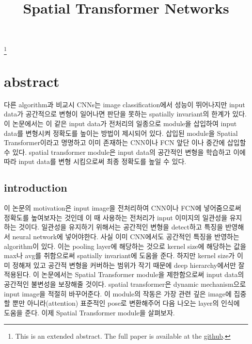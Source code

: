 \documentclass[extendedabs]{bmvc2k}
\begin{document}
\title{Spatial Transformer Networks}
\maketitle
\let\thefootnote\relax\footnote{This is an extended abstract. The full paper is available at the \href{https://github.com/LeeGwanHui/TIL/tree/main/deeplearning_ham}{github}. }
\vspace{-0.2in}

\section{abstract}

\quad 다른 algorithm과 비교시 CNNs는 image classification에서 성능이 뛰어나지만 input data가 공간적으로 변형이 일어나면
 판단을 못하는 spatially invariant의 한계가 있다.\cite{jaderberg2015spatial} 이 논문에서는 이 같은 input data가 전처리의 일종으로 module을 삽입하여 
 input data를 변형시켜 정확도를 높이는 방법이 제시되어 있다. 삽입된 module을 Spatial Transformer이라고 명명하고 이미 존재하는
 CNN이나 FCN 앞단 이나 중간에 삽입할 수 있다. spatial transformer module은 input data의 공간적인 변형을 
 학습하고 이에 따라 input data를 변형 시킴으로써 최종 정확도를 높일 수 있다.

 \subsection{introduction}
 \quad 이 논문의 motivation은 input image을 전처리하여 CNN이나 FCN에 넣어줌으로써 정확도를 높여보자는 것인데 이 때 사용하는 전처리가 input 이미지의
 일관성을 유지하는 것이다. 일관성을 유지하기 위해서는 공간적인 변형을 detect하고 특징을 반영해서 neural network에 넣어야한다.
 사실 이미 CNN에서도 공간적인 특징을 반영하는 algorithm이 있다. 이는 pooling layer에 해당하는 것으로 kernel size에 
 해당하는 값을 max나 avg를 취함으로써 spatially invariant에 도움을 준다. 하지만 kernel size가 이미 정해져 있고 공간적 변형을 커버하는 범위가 작기 때문에
 deep hierarchy에서만 잘 적용된다. 이 논문에서는 Spatial Transformer module을 제한함으로써 input data의 공간적인 불변성을 보장해줄 것이다.
 spatial transformer은 dynamic mechanism으로 input image을 적절히 바꾸어준다. 이 module의 작동은 가장 관련 깊은 image에 집중할 뿐만 아니라(attention)
 표준적인 pose로 변환해주어 다음 나오는 layer의 인식에 도움을 준다. 이제 Spatial Transformer module을 살펴보자.
\end{document}
